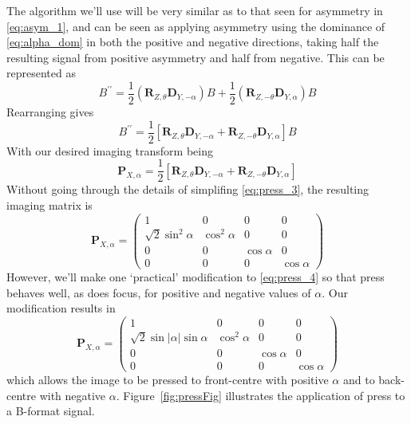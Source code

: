 \documentclass[12pt]{article}
\providecommand{\abs}[1]{\lvert#1\rvert}
\begin{document}
The algorithm we'll use will be very similar as to that seen for asymmetry in \eqref{eq:asym_1}, and can be seen as applying asymmetry using the dominance of \eqref{eq:alpha_dom} in both the positive and negative directions, taking half the resulting signal from positive asymmetry and half from negative. This can be represented as \begin{equation}	\label{eq:press_1}
	B^{\prime\prime} = \frac{1}{2}(\mathbf{R}_{Z, \theta} \mathbf{D}_{Y, -\alpha}) B + \frac{1}{2}(\mathbf{R}_{Z, -\theta} \mathbf{D}_{Y, \alpha}) B
\end{equation} Rearranging gives \begin{equation}	\label{eq:press_2}
	B^{\prime\prime} = \frac{1}{2}[\mathbf{R}_{Z, \theta} \mathbf{D}_{Y, -\alpha} + \mathbf{R}_{Z, -\theta} \mathbf{D}_{Y, \alpha}] B
\end{equation} With our desired imaging transform being \begin{equation}	\label{eq:press_3}
	\mathbf{P}_{X, \alpha} = \frac{1}{2}[\mathbf{R}_{Z, \theta} \mathbf{D}_{Y, -\alpha} + \mathbf{R}_{Z, -\theta} \mathbf{D}_{Y, \alpha}]
\end{equation} Without going through the details of simplifing \eqref{eq:press_3}, the resulting imaging matrix is \begin{equation}			\label{eq:press_4}
\mathbf{P}_{X, \alpha} = \begin{pmatrix}
	1 & 0 & 0 & 0\\
	\sqrt{2}\sin^2{\alpha} & \cos^2{\alpha} & 0 & 0\\
	0 & 0 & \cos{\alpha} & 0\\
	0 & 0 & 0 & \cos{\alpha}
\end{pmatrix}
\end{equation} However, we'll make one `practical' modification to \eqref{eq:press_4} so that press behaves well, as does focus, for positive and negative values of \(\alpha\). Our modification results in \begin{equation}			\label{eq:press}
\mathbf{P}_{X, \alpha} = \begin{pmatrix}
	1 & 0 & 0 & 0\\
	\sqrt{2}\sin{\abs{\alpha}}\sin{\alpha} & \cos^2{\alpha} & 0 & 0\\
	0 & 0 & \cos{\alpha} & 0\\
	0 & 0 & 0 & \cos{\alpha}
\end{pmatrix}
\end{equation} which allows the image to be pressed to front-centre with positive \(\alpha\) and to back-centre with negative \(\alpha\). Figure~\ref{fig:pressFig} illustrates the application of press to a B-format signal.
\end{document}
